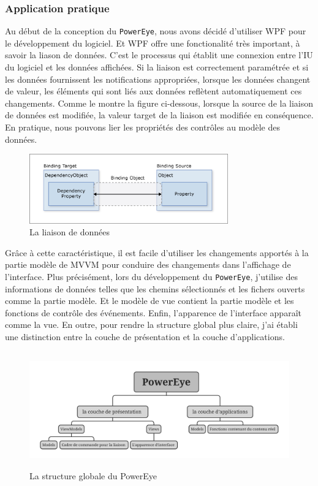 \subsubsection{Application pratique}
Au début de la conception du \texttt{PowerEye}, nous avons décidé d'utiliser \gls{WPF} pour le développement du logiciel. Et WPF offre une fonctionalité très important, à savoir la liason de données. C'est le processus qui établit une connexion entre l’\gls{IU} du logiciel et les données affichées. Si la liaison est correctement paramétrée et si les données fournissent les notifications appropriées, lorsque les données changent de valeur, les éléments qui sont liés aux données reflètent automatiquement ces changements. Comme le montre la figure ci-dessous, lorsque la source de la liaison de données est modifiée, la valeur target de la liaison est modifiée en conséquence. En pratique, nous pouvons lier les propriétés des contrôles au modèle des données.
\begin{figure}[H]
    \centering
    \includegraphics[height=3cm]{ressources/images/basic-data-binding-diagram.png}
    \caption{La liaison de données}
\end{figure}

Grâce à cette caractéristique, il est facile d'utiliser les changements apportés à la partie modèle de MVVM pour conduire des changements dans l'affichage de l'interface. Plus précisément, lors du développement du \texttt{PowerEye}, j'utilise des informations de données telles que les chemins sélectionnés et les fichers ouverts comme la partie modèle. Et le modèle de vue contient la partie modèle et les fonctions de contrôle des événements. Enfin, l'apparence de l'interface apparaît comme la vue. En outre, pour rendre la structure global plus claire, j'ai établi une distinction entre la couche de présentation et la couche d'applications.
\begin{figure}[H]
    \centering
    \includegraphics[height=5cm]{ressources/images/PowerEye_Structure.jpg}
    \caption{La structure globale du PowerEye}
\end{figure}

